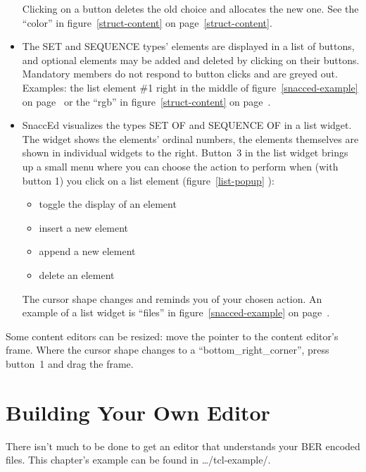 \begin{itemize}
    Clicking on a button deletes the old choice and allocates the new one.
    See the ``{\C color}'' in figure~\ref{struct-content} on page~\ref{struct-content}.
  \item
    The SET and SEQUENCE types' elements are displayed in a list of buttons, and optional elements may be added and deleted by clicking on their buttons.
    Mandatory members do not respond to button clicks and are greyed out.
    Examples: the list element \#1 right in the middle of figure~\ref{snacced-example} on page~\pageref{snacced-example} or the ``{\C rgb}'' in figure~\ref{struct-content} on page~\pageref{struct-content}.
  \item \label{cont-ed-list-sect}
    SnaccEd visualizes the types SET OF and SEQUENCE OF in a list widget.
    The widget shows the elements' ordinal numbers, the elements themselves are shown in individual widgets to the right.
    Button~3 in the list widget brings up a small menu where you can choose the action to perform when (with button 1) you click on a list element (figure~\ref{list-popup} ):
    \begin{itemize}
      \item toggle the display of an element
      \item insert a new element
      \item append a new element
      \item delete an element
    \end{itemize}
    The cursor shape changes and reminds you of your chosen action.
    An example of a list widget is ``{\C files}'' in figure~\ref{snacced-example} on page~\pageref{snacced-example}.
\end{itemize}
Some content editors can be resized: move the pointer to the content editor's frame.
Where the cursor shape changes to a ``bottom\_right\_corner'', press button~1 and drag the frame.

\section{\label{editor-building}Building Your Own Editor}

There isn't much to be done to get an editor that understands your BER encoded files.
This chapter's example can be found in {\ufn \dots/tcl-example/}.

